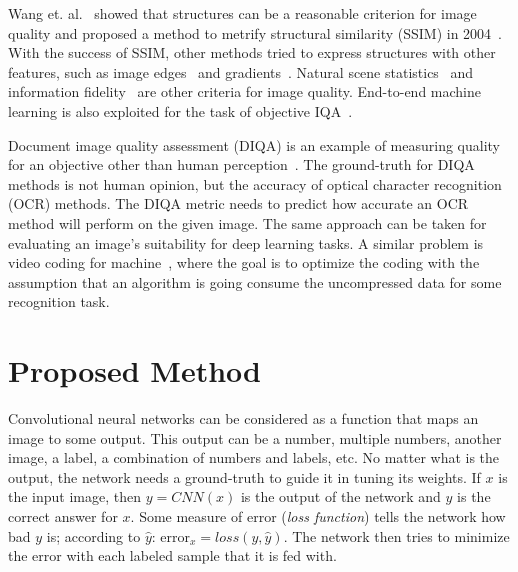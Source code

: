 \documentclass{article}
\begin{document}
Wang et. al.~\cite{wang2002universal} showed that structures can be a reasonable criterion for image quality and proposed a method to metrify structural similarity (SSIM) in 2004~\cite{wang2004image}. With the success of SSIM, other methods tried to express structures with other features, such as image edges~\cite{chen2006edge} and gradients~\cite{Xue2014}. Natural scene statistics~\cite{moorthy2011blind} and information fidelity~\cite{sheikh2006image} are other criteria for image quality. End-to-end machine learning is also exploited for the task of objective IQA~\cite{yang2019survey, ye2012unsupervised,kim2017deep}.

Document image quality assessment (DIQA) is an example of measuring quality for an objective other than human perception~\cite{ye2013document}. The ground-truth for DIQA methods is not human opinion, but the accuracy of optical character recognition (OCR) methods. The DIQA metric needs to predict how accurate an OCR method will perform on the given image. The same approach can be taken for evaluating an image's suitability for deep learning tasks. A similar problem is video coding for machine~\cite{duan2020video}, where the goal is to optimize the coding with the assumption that an algorithm is going consume the uncompressed data for some recognition task.


\section{Proposed Method} \label{sec:proposed_method}
Convolutional neural networks can be considered as a function that maps an image to some output. This output can be a number, multiple numbers, another image, a label, a combination of numbers and labels, etc. No matter what is the output, the network needs a ground-truth to guide it in tuning its weights. If $x$ is the input image, then $y = CNN(x)$ is the output of the network and $\hat{y}$ is the correct answer for $x$. Some measure of error (\emph{loss function}) tells the network how bad $y$ is; according to $\hat{y}$: $\text{error}_x=loss(y, \hat{y})$. The network then tries to minimize the $\text{error}$ with each labeled sample that it is fed with.
\end{document}
